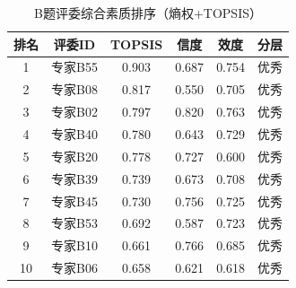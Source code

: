 \begin{table}[h]
\centering
\caption{B题评委综合素质排序（熵权+TOPSIS）}
\begin{tabular}{cccccc}
\hline
排名 & 评委ID & TOPSIS & 信度 & 效度 & 分层 \\
\hline
1 & 专家B55 & 0.903 & 0.687 & 0.754 & 优秀 \\
2 & 专家B08 & 0.817 & 0.550 & 0.705 & 优秀 \\
3 & 专家B02 & 0.797 & 0.820 & 0.763 & 优秀 \\
4 & 专家B40 & 0.780 & 0.643 & 0.729 & 优秀 \\
5 & 专家B20 & 0.778 & 0.727 & 0.600 & 优秀 \\
6 & 专家B39 & 0.739 & 0.673 & 0.708 & 优秀 \\
7 & 专家B45 & 0.730 & 0.756 & 0.725 & 优秀 \\
8 & 专家B53 & 0.692 & 0.587 & 0.723 & 优秀 \\
9 & 专家B10 & 0.661 & 0.766 & 0.685 & 优秀 \\
10 & 专家B06 & 0.658 & 0.621 & 0.618 & 优秀 \\
\hline
\end{tabular}
\end{table}